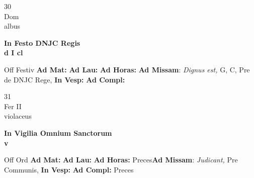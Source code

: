 \documentclass[10pt, openany]{book}
\begin{document}
        \begin{center}
            \begin{minipage}{3.5in}
                \vspace{2em}
                \begin{minipage}{0.5in}
                    {\Huge 30} \\
                    {\normalsize Dom} \\
                    {\normalsize albus}
                \end{minipage}
                \begin{minipage}{3.0in}
                    \textbf{ \large In Festo DNJC Regis \\
                    \textnormal{\normalsize d I cl}} \\ 
                \end{minipage}
                \begin{justify}Off Festiv
                    \textbf{Ad Mat: }
                    \textbf{Ad Lau: }
                    \textbf{Ad Horas: }\textbf{Ad Missam}: \textit{Dignus est,} G, C, Pre de DNJC Rege,  
                    \textbf{In Vesp: }
                    \textbf{Ad Compl: }
                \end{justify}
            \end{minipage}
        \end{center}
    
        \begin{center}
            \begin{minipage}{3.5in}
                \vspace{2em}
                \begin{minipage}{0.5in}
                    {\Huge 31} \\
                    {\normalsize Fer II} \\
                    {\normalsize violaceus}
                \end{minipage}
                \begin{minipage}{3.0in}
                    \textbf{ \large In Vigilia Omnium Sanctorum \\
                    \textnormal{\normalsize v}} \\ 
                \end{minipage}
                \begin{justify}Off Ord
                    \textbf{Ad Mat: }
                    \textbf{Ad Lau: }
                    \textbf{Ad Horas: }Preces\textbf{Ad Missam}: \textit{Judicant,} Pre Communis,  
                    \textbf{In Vesp: }
                    \textbf{Ad Compl: }Preces
                \end{justify}
            \end{minipage}
        \end{center}
    
\end{document}
